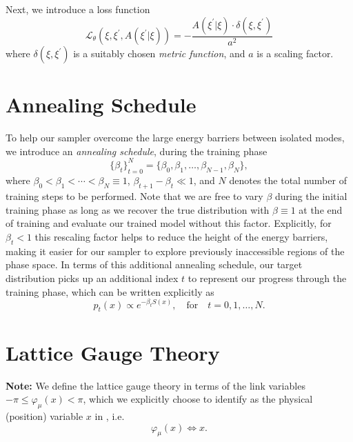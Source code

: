 \documentclass{article} %
\begin{document}
Next, we introduce a loss function
%
\begin{equation}
   \mathcal{L}_{\theta}{\left(\xi, \xi^{\prime}, A(\xi^{\prime}|\xi)\right)}
      = -\frac{A(\xi^{\prime}|\xi)\cdot \delta(\xi, \xi^{\prime})}{a^{2}}
\end{equation}
%
where \(\delta(\xi, \xi^{\prime})\) is a suitably chosen \emph{metric function}, and \(a\) is a scaling factor.
%
\section{\label{sec:annealing_schedule}Annealing Schedule}
%
To help our sampler overcome the large energy barriers between isolated modes, we introduce an \emph{annealing
schedule}, during the training phase
%
\begin{equation}
   {\{\beta_{t}\}}_{t=0}^{N} = \{\beta_{0}, \beta_{1}, \ldots, \beta_{N-1}, \beta_{N}\},
\end{equation}
%
where \(\beta_{0} < \beta_{1} < \cdots < \beta_{N} \equiv 1\), \(\beta_{t+1} - \beta_{t} \ll 1\), and \(N\) denotes the
total number of training steps to be performed.
%
Note that we are free to vary \(\beta\) during the initial training phase as long as we recover the true distribution
with \(\beta \equiv 1\) at the end of training and evaluate our trained model without this factor.
%
Explicitly, for \(\beta_{t} < 1\) this rescaling factor helps to reduce the height of the energy barriers, making it
easier for our sampler to explore previously inaccessible regions of the phase space.
%
In terms of this additional annealing schedule, our target distribution picks up an additional index \(t\) to represent
our progress through the training phase, which can be written explicitly as  
%
\begin{equation}
   p_{t}(x)\propto e^{-\beta_{t} S(x)}, \quad\text{for}\quad t = 0, 1, \ldots, N.
\end{equation}
%

\section{\label{sec:lattice_gauge_theory}Lattice Gauge Theory}
%
\textbf{Note:} We define the lattice gauge theory in terms of the link variables \(-\pi \leq \varphi_{\mu}(x) < \pi\),
which we explicitly choose to identify as the physical (position) variable \(x\) in , i.e.\ 
\begin{equation}
   \varphi_{\mu}(x)\Longleftrightarrow x.
\end{equation}
%
\end{document}
